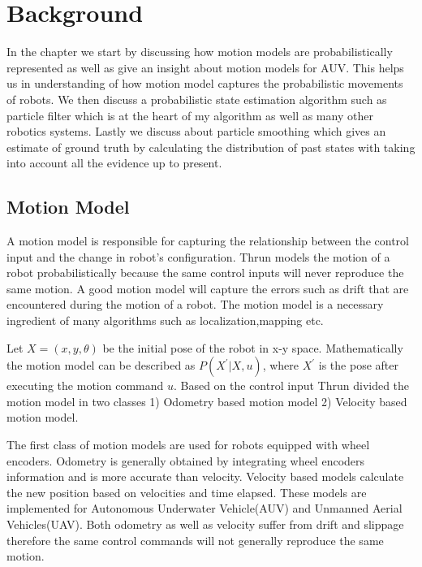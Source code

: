 \documentclass[12pt]{dalcsthesis}
\begin{document}
\chapter{Background}
In the chapter we start by discussing how motion models are probabilistically represented as well as give an insight about motion models for AUV. This helps us in understanding of how motion model captures the probabilistic movements of robots. We then discuss a probabilistic state estimation algorithm such as particle filter \cite{ristic2004beyond} \cite{chen2003bayesian} which is at the heart of my algorithm as well as many other robotics systems. Lastly we discuss about particle smoothing \cite{doucet2000monte} \cite{doucet2009tutorial} which gives an estimate of ground truth by calculating the distribution of past states with taking into account all the evidence up to present. 

\section{Motion Model}
\label{chap-:Motion Model}
A motion model is responsible for capturing the relationship between the control input and the change in robot's configuration. Thrun \cite{thrun2005probabilistic} models the motion of a robot probabilistically because the same
control inputs will never reproduce the same motion. A good motion model will capture the errors such as drift that are encountered during the motion of a robot. The motion model is a necessary ingredient of many algorithms such as localization,mapping etc. 

Let $X=(x,y,\theta)$ be the initial pose of the robot in x-y space. Mathematically the motion model can be described as $P(X^{'}|X,u)$, where $X^{'}$ is the pose after executing the motion command $u$. Based on the control input Thrun \cite{thrun2005probabilistic} divided the motion model in two classes 1) Odometry based motion model 2) Velocity based motion model.

The first class of motion models are used for robots equipped with wheel encoders. Odometry is generally obtained by integrating wheel encoders information and is more accurate than velocity.  
Velocity based models calculate the new position based on velocities and time elapsed. These models are implemented for Autonomous Underwater Vehicle(AUV) and Unmanned Aerial Vehicles(UAV). Both odometry as well as velocity suffer from drift and slippage therefore the same control commands will not generally reproduce the same motion.
\end{document}
